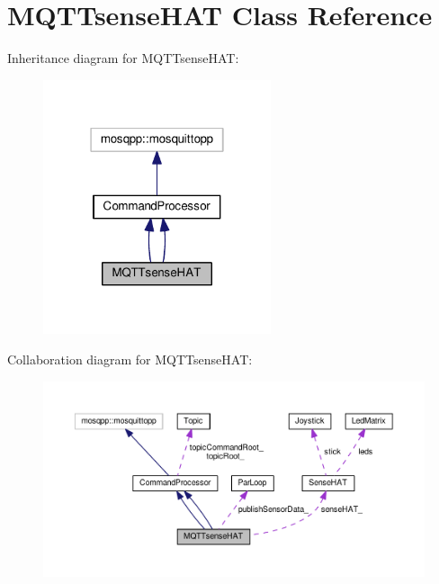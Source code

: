 \hypertarget{class_m_q_t_tsense_h_a_t}{}\section{M\+Q\+T\+Tsense\+H\+AT Class Reference}
\label{class_m_q_t_tsense_h_a_t}


Inheritance diagram for M\+Q\+T\+Tsense\+H\+AT\+:
\nopagebreak
\begin{figure}[H]
\begin{center}
\leavevmode
\includegraphics[width=190pt]{class_m_q_t_tsense_h_a_t__inherit__graph}
\end{center}
\end{figure}


Collaboration diagram for M\+Q\+T\+Tsense\+H\+AT\+:
\nopagebreak
\begin{figure}[H]
\begin{center}
\leavevmode
\includegraphics[width=350pt]{class_m_q_t_tsense_h_a_t__coll__graph}
\end{center}
\end{figure}
